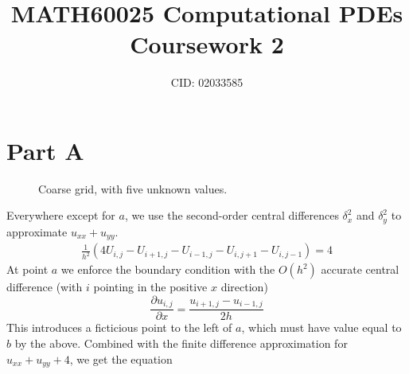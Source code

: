 \documentclass{article}
\title{MATH60025 Computational PDEs Coursework 2}
\author{
CID: 02033585
}
\date{}
\numberwithin{equation}{section}
\theoremstyle{definition}
\newcommand{\pp}[2]{\frac{\partial #1}{\partial #2}}
\begin{document}
\maketitle

\section{Part A}


\begin{figure}[H]
    \centering
    \caption{Coarse grid, with five unknown values.}
    \label{fig:grid}
\end{figure}


Everywhere except for $a$, we use the second-order central differences $\delta^2_x$ and $\delta^2_y$ to approximate $u_{xx} + u_{yy}$.
\begin{align}
    \frac{1}{h^2} \left(
        4U_{i,j} - U_{i+1,j} - U_{i-1,j} - U_{i,j+1} - U_{i,j-1}
    \right)
    = 4
\end{align}
At point $a$ we enforce the boundary condition with the $O(h^2)$ accurate central difference (with $i$ pointing in the positive $x$ direction)
\begin{equation}
    \pp{u_{i,j}}{x}=\frac{u_{i+1,j}-u_{i-1,j}}{2h}
\end{equation}
This introduces a ficticious point to the left of $a$, which must have value equal to $b$ by the above. Combined with the finite difference approximation for $u_{xx} + u_{yy} + 4$, we get the equation
\end{document}
